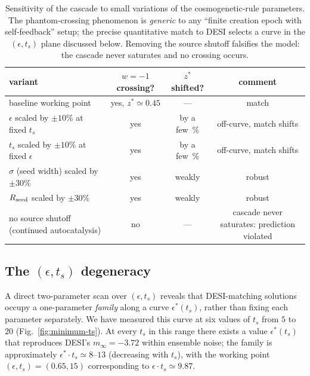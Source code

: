 \documentclass[11pt,a4paper]{article}
\begin{document}
\begin{table}[!htbp]
\centering
\begin{tabular}{lccc}
\toprule
variant & $w = -1$ crossing? & $z^\ast$ shifted? & comment \\
\midrule
baseline working point & yes, $z^\ast \simeq 0.45$ & --- & match \\
$\epsilon$ scaled by $\pm 10\%$ at fixed $t_s$ & yes & by a few~\% & off-curve, match shifts \\
$t_s$ scaled by $\pm 10\%$ at fixed $\epsilon$ & yes & by a few~\% & off-curve, match shifts \\
$\sigma$ (seed width) scaled by $\pm 30\%$ & yes & weakly & robust \\
$R_{\rm seed}$ scaled by $\pm 30\%$ & yes & weakly & robust \\
no source shutoff (continued autocatalysis) & no & --- & cascade never saturates: prediction violated \\
\bottomrule
\end{tabular}
\caption{Sensitivity of the cascade to small variations of the
cosmogenetic-rule parameters. The phantom-crossing phenomenon is
\emph{generic} to any ``finite creation epoch with self-feedback''
setup; the precise quantitative match to DESI selects a curve in the
$(\epsilon, t_s)$ plane discussed below. Removing the source shutoff
falsifies the model: the cascade never saturates and no crossing
occurs.}
\label{tab:sensitivity}
\end{table}

\subsection{The $(\epsilon, t_s)$ degeneracy}
\label{sec:eps-ts}

A direct two-parameter scan over $(\epsilon, t_s)$ reveals that
DESI-matching solutions occupy a one-parameter \emph{family} along a
curve $\epsilon^*(t_s)$, rather than fixing each parameter
separately. We have measured this curve at six values of $t_s$ from
$5$ to $20$ (Fig.~\ref{fig:minimum-ts}). At every $t_s$ in this range
there exists a value $\epsilon^*(t_s)$ that reproduces DESI's
$m_\infty = -3.72$ within ensemble noise; the family is approximately
$\epsilon^* \cdot t_s \simeq 8\text{--}13$ (decreasing with $t_s$),
with the working point $(\epsilon, t_s) = (0.65, 15)$ corresponding to
$\epsilon \cdot t_s \simeq 9.87$.
\end{document}
